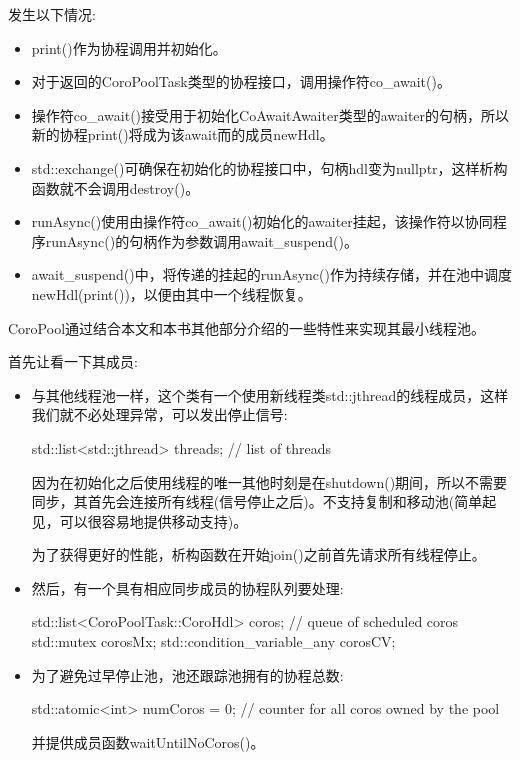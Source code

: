 发生以下情况:

\begin{itemize}
\item
print()作为协程调用并初始化。

\item
对于返回的CoroPoolTask类型的协程接口，调用操作符co\_await()。

\item
操作符co\_await()接受用于初始化CoAwaitAwaiter类型的awaiter的句柄，所以新的协程print()将成为该await而的成员newHdl。

\item
std::exchange()可确保在初始化的协程接口中，句柄hdl变为nullptr，这样析构函数就不会调用destroy()。

\item
runAsync()使用由操作符co\_await()初始化的awaiter挂起，该操作符以协同程序runAsync()的句柄作为参数调用await\_suspend()。

\item
await\_suspend()中，将传递的挂起的runAsync()作为持续存储，并在池中调度newHdl(print())，以便由其中一个线程恢复。
\end{itemize}


CoroPool通过结合本文和本书其他部分介绍的一些特性来实现其最小线程池。

首先让看一下其成员:

\begin{itemize}
\item
与其他线程池一样，这个类有一个使用新线程类std::jthread的线程成员，这样我们就不必处理异常，可以发出停止信号:

\begin{cpp}
std::list<std::jthread> threads; // list of threads
\end{cpp}

因为在初始化之后使用线程的唯一其他时刻是在shutdown()期间，所以不需要同步，其首先会连接所有线程(信号停止之后)。不支持复制和移动池(简单起见，可以很容易地提供移动支持)。

为了获得更好的性能，析构函数在开始join()之前首先请求所有线程停止。

\item
然后，有一个具有相应同步成员的协程队列要处理:

\begin{cpp}
std::list<CoroPoolTask::CoroHdl> coros; // queue of scheduled coros
std::mutex corosMx;
std::condition_variable_any corosCV;
\end{cpp}

\item
为了避免过早停止池，池还跟踪池拥有的协程总数:

\begin{cpp}
std::atomic<int> numCoros = 0; // counter for all coros owned by the pool
\end{cpp}

并提供成员函数waitUntilNoCoros()。
\end{itemize}

